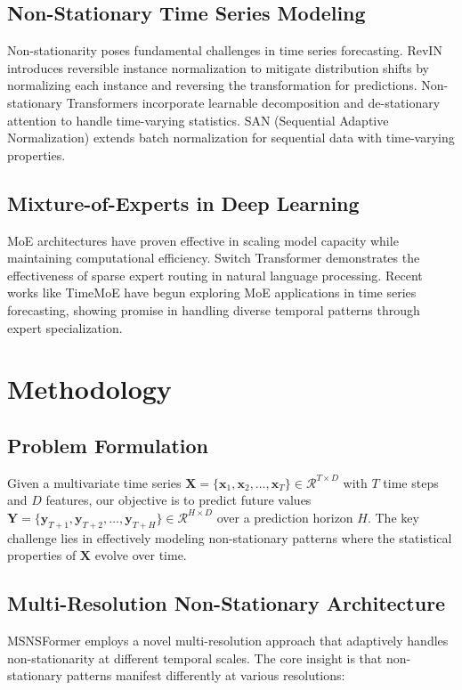 \documentclass{article}
\begin{document}
\subsection{Non-Stationary Time Series Modeling}
Non-stationarity poses fundamental challenges in time series forecasting. RevIN \cite{revin} introduces reversible instance normalization to mitigate distribution shifts by normalizing each instance and reversing the transformation for predictions. Non-stationary Transformers \cite{nonstationary} incorporate learnable decomposition and de-stationary attention to handle time-varying statistics. SAN (Sequential Adaptive Normalization) extends batch normalization for sequential data with time-varying properties.

\subsection{Mixture-of-Experts in Deep Learning}
MoE architectures have proven effective in scaling model capacity while maintaining computational efficiency. Switch Transformer \cite{switchtransformer} demonstrates the effectiveness of sparse expert routing in natural language processing. Recent works like TimeMoE \cite{timemoe} have begun exploring MoE applications in time series forecasting, showing promise in handling diverse temporal patterns through expert specialization.

\section{Methodology}
\label{sec:methodology}

\subsection{Problem Formulation}
Given a multivariate time series $\mathbf{X} = \{\mathbf{x}_1, \mathbf{x}_2, \ldots, \mathbf{x}_T\} \in \mathcal{R}^{T \times D}$ with $T$ time steps and $D$ features, our objective is to predict future values $\mathbf{Y} = \{\mathbf{y}_{T+1}, \mathbf{y}_{T+2}, \ldots, \mathbf{y}_{T+H}\} \in \mathcal{R}^{H \times D}$ over a prediction horizon $H$. The key challenge lies in effectively modeling non-stationary patterns where the statistical properties of $\mathbf{X}$ evolve over time.

\subsection{Multi-Resolution Non-Stationary Architecture}
MSNSFormer employs a novel multi-resolution approach that adaptively handles non-stationarity at different temporal scales. The core insight is that non-stationary patterns manifest differently at various resolutions:
\end{document}

